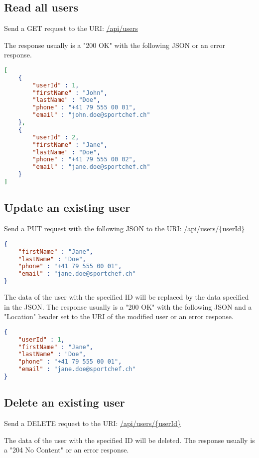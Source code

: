 \documentclass[a4paper,openright,twoside]{report}
\begin{document}
\subsection{Read all users}
Send a GET request to the URI: \url{/api/users}

The response usually is a "200 OK" with the following JSON or an error response.

\begin{lstlisting}[language=json]
[
	{
		"userId" : 1,
		"firstName" : "John",
		"lastName" : "Doe",
		"phone" : "+41 79 555 00 01",
		"email" : "john.doe@sportchef.ch"
	},
	{
		"userId" : 2,
		"firstName" : "Jane",
		"lastName" : "Doe",
		"phone" : "+41 79 555 00 02",
		"email" : "jane.doe@sportchef.ch"
	}
]
\end{lstlisting}

\subsection{Update an existing user}
Send a PUT request with the following JSON to the URI: \url{/api/users/{userId}}

\begin{lstlisting}[language=json]
{
	"firstName" : "Jane",
	"lastName" : "Doe",
	"phone" : "+41 79 555 00 01",
	"email" : "jane.doe@sportchef.ch"
}
\end{lstlisting}

The data of the user with the specified ID will be replaced by the data specified in the JSON. The response usually is a "200 OK" with the following JSON and a "Location" header set to the URI of the modified user or an error response.

\begin{lstlisting}[language=json]
{
	"userId" : 1,
	"firstName" : "Jane",
	"lastName" : "Doe",
	"phone" : "+41 79 555 00 01",
	"email" : "jane.doe@sportchef.ch"
}
\end{lstlisting}

\subsection{Delete an existing user}
Send a DELETE request to the URI: \url{/api/users/{userId}}

The data of the user with the specified ID will be deleted. The response usually is a "204 No Content" or an error response.
\end{document}

